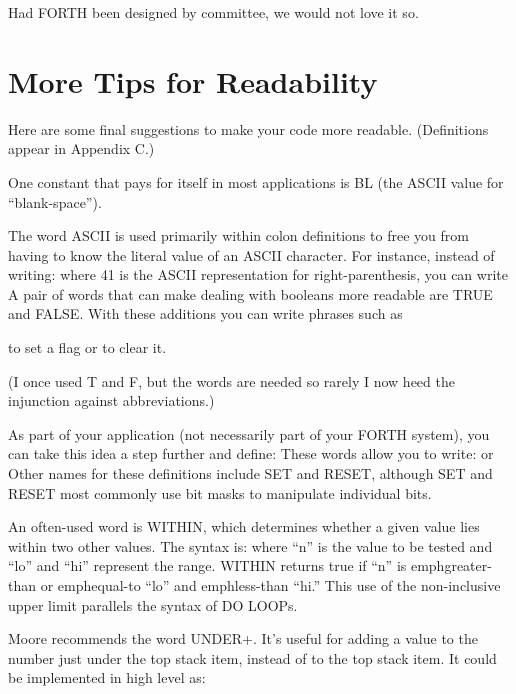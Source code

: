 Had FORTH been designed by committee, we would not love it so.

\section{More Tips for Readability}

Here are some final suggestions to make your code more readable.
(Definitions appear in Appendix C.)

One constant that pays for itself in most applications is BL (the
ASCII value for ``blank-space'').

The word ASCII is used primarily within colon definitions to free
you from having to know the literal value of an ASCII character.  For instance,
instead of writing:
where 41 is the ASCII representation for right-parenthesis, you can write
A pair of words that can make dealing with booleans more readable are
TRUE and FALSE.  With these additions you can write phrases such as

to set a flag or
to clear it.

(I once used T and F, but the words are needed so rarely I now heed
the injunction against abbreviations.)

As part of your application (not necessarily part of your FORTH
system), you can take this idea a step further and define:
These words allow you to write:
or
Other names for these definitions include SET and RESET, although
SET and RESET most commonly use bit masks to manipulate individual
bits.

An often-used word is WITHIN, which determines whether a given
value lies within two other values.  The syntax is:
where ``n'' is the value to be tested and ``lo'' and ``hi'' represent the range.
WITHIN returns true if ``n'' is emph{greater-than} or emph{equal-to} ``lo'' and
emph{less-than} ``hi.'' This use of the non-inclusive upper limit parallels the syntax
of DO LOOPs.

Moore recommends the word UNDER+.  It's useful for adding a
value to the number just under the top stack item, instead of to the top
stack item.  It could be implemented in high level as:
